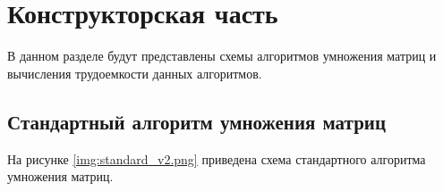 \chapter{Конструкторская часть}
В данном разделе будут представлены схемы алгоритмов умножения матриц и вычисления трудоемкости данных алгоритмов.
 

\section{Стандартный алгоритм умножения матриц}

На рисунке \ref{img:standard_v2.png} приведена схема стандартного алгоритма умножения матриц.
\\
\\
\\
\\
\\
\\
\\
\\
\\
\\
\\
\\
\\
\\
\\
\\
\\
\\
\\
\\
\\
\\



\FloatBarrier
